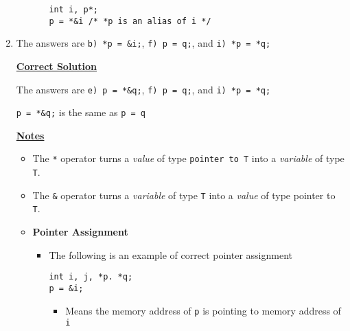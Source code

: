 \documentclass[12pt]{article}
\begin{document}
\begin{enumerate}[1.]
\begin{itemize}
\begin{itemize}
            \texttt{int i, p*;\\
            p = *\&i /* *p is an alias of i */}
        \end{itemize}
    \end{itemize}

    \item

    \bigskip

    The answers are \texttt{b) *p = \&i;}, \texttt{f) p = q;}, and \texttt{i) *p = *q;}

    \bigskip

    \begin{mdframed}
    \underline{\textbf{Correct Solution}}

    \bigskip

    The answers are \color{red}\texttt{e) p = *\&q;}\color{black}, \texttt{f) p = q;}, and \texttt{i) *p = *q;}

    \bigskip

    \color{red}\texttt{p = *\&q;} is the same as \texttt{p = q}\color{black}

    \end{mdframed}

    \underline{\textbf{Notes}}

    \begin{itemize}
        \item The \texttt{*} operator turns a \textit{value} of type \texttt{pointer to T} into a \textit{variable} of type \texttt{T}.
        \item The \texttt{\&} operator turns a \textit{variable} of type \texttt{T} into a \textit{value} of type pointer to \texttt{T}.
        \item \textbf{Pointer Assignment}

        \begin{itemize}
            \item The following is an example of correct pointer assignment

            \bigskip

            \texttt{int i, j, *p. *q;\\
            p = \&i;
            }

            \bigskip

            \begin{itemize}
                \item Means the memory address of \texttt{p} is pointing to memory address of \texttt{i}
            \end{itemize}


\end{itemize}
\end{itemize}
\end{enumerate}
\end{document}
